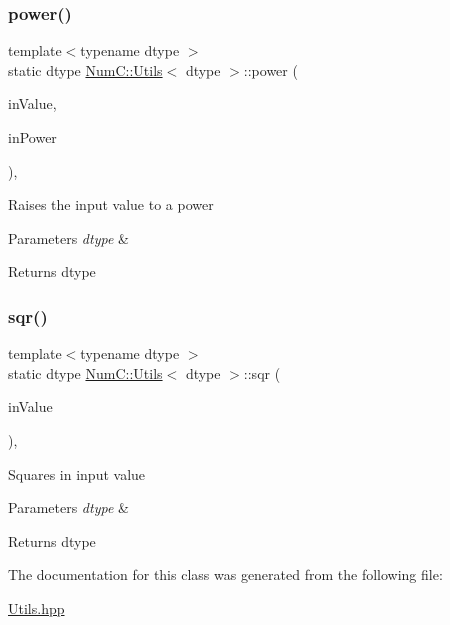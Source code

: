 \subsubsection{\texorpdfstring{power()}{power()}}
{\footnotesize\ttfamily template$<$typename dtype $>$ \\
static dtype \mbox{\hyperlink{class_num_c_1_1_utils}{Num\+C\+::\+Utils}}$<$ dtype $>$\+::power (\begin{DoxyParamCaption}\item[{dtype}]{in\+Value,  }\item[{\mbox{\hyperlink{namespace_num_c_a60b2e2f49e1ff61059731c154e560869}{uint8}}}]{in\+Power }\end{DoxyParamCaption})\hspace{0.3cm}{\ttfamily [inline]}, {\ttfamily [static]}}

Raises the input value to a power


\begin{DoxyParams}{Parameters}
{\em dtype} & \\
\hline
\end{DoxyParams}
\begin{DoxyReturn}{Returns}
dtype 
\end{DoxyReturn}
\mbox{\label{class_num_c_1_1_utils_a3fe9ffd53cc0f54fd961350bf45d60ae}} 
\subsubsection{\texorpdfstring{sqr()}{sqr()}}
{\footnotesize\ttfamily template$<$typename dtype $>$ \\
static dtype \mbox{\hyperlink{class_num_c_1_1_utils}{Num\+C\+::\+Utils}}$<$ dtype $>$\+::sqr (\begin{DoxyParamCaption}\item[{dtype}]{in\+Value }\end{DoxyParamCaption})\hspace{0.3cm}{\ttfamily [inline]}, {\ttfamily [static]}}

Squares in input value


\begin{DoxyParams}{Parameters}
{\em dtype} & \\
\hline
\end{DoxyParams}
\begin{DoxyReturn}{Returns}
dtype 
\end{DoxyReturn}


The documentation for this class was generated from the following file\+:\begin{DoxyCompactItemize}
\item 
\mbox{\hyperlink{_utils_8hpp}{Utils.\+hpp}}\end{DoxyCompactItemize}
